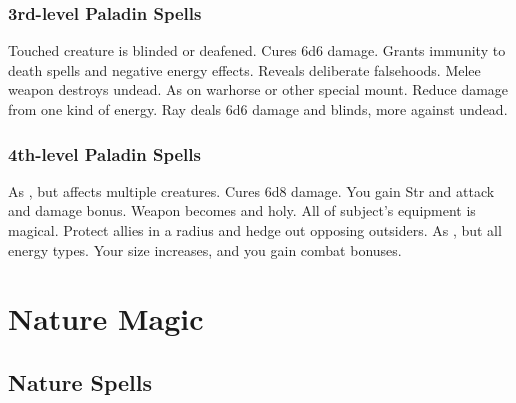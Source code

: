 \subsubsection{3rd-level Paladin Spells}
\begin{spelllist} 
   Touched creature is blinded or deafened.
   Cures 6d6 damage.
   Grants immunity to death spells and negative energy effects.
   Reveals deliberate falsehoods.
   Melee weapon destroys undead.
   As  on warhorse or other special mount.
   Reduce damage from one kind of energy.
   Ray deals 6d6 damage and blinds, more against undead.
\end{spelllist}

\subsubsection{4th-level Paladin Spells}
\begin{spelllist}
   As , but affects multiple creatures.
   Cures 6d8 damage.
   You gain  Str and attack and damage bonus.
   Weapon becomes  and holy.
   All of subject's equipment is magical.
   Protect allies in a \areamed radius and hedge out opposing outsiders.
   As , but all energy types. 
   Your size increases, and you gain combat bonuses.
\end{spelllist}

\section{Nature Magic}\label{Nature Magic}
\subsection{Nature Spells}\label{Nature Spells}

